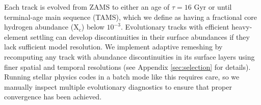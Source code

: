 \documentclass[twocolumn,twocolappendix]{aastex6}
\begin{document}
Each track is evolved from ZAMS to either an age of $\tau=16$ Gyr or until terminal-age main sequence (TAMS), which we define as having a fractional core hydrogen abundance (X$_{\text{c}}$) below $10^{-3}$. Evolutionary tracks with efficient heavy-element settling can develop discontinuities in their surface abundances if they lack sufficient model resolution. We implement adaptive remeshing by recomputing any track with abundance discontinuities in its surface layers using finer spatial and temporal resolutions (see Appendix \ref{sec:selection} for details). Running stellar physics codes in a batch mode like this requires care, so we manually inspect multiple evolutionary diagnostics to ensure that proper convergence has been achieved. %



\end{document}
